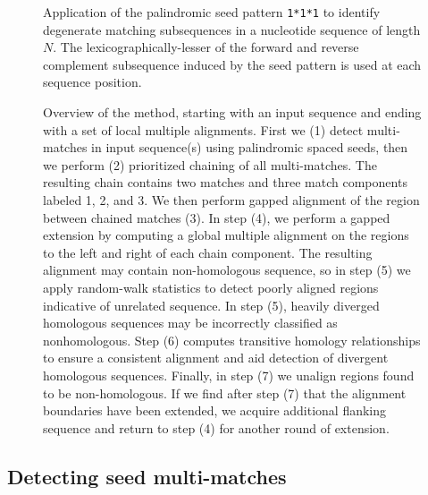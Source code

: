 \documentclass[twoside,11pt]{article}
\begin{document}
\begin{figure}[t]
\centering {}
\caption{Application of the palindromic seed pattern
\texttt{1*1*1} to identify degenerate matching subsequences in a
nucleotide sequence of length $N$. The lexicographically-lesser of
the forward and reverse complement subsequence induced by the seed
pattern is used at each sequence position.}

\label{fig-seeds}\vspace{-0.2cm}
\end{figure}

\begin{figure}
\begin{center}
\end{center}
\caption{Overview of the method, starting with an input sequence and ending with a set of local multiple alignments. First we (1) detect multi-matches in input sequence(s) using palindromic spaced seeds, then we perform (2) prioritized chaining of all multi-matches.  The resulting chain contains two matches and three match components labeled 1, 2, and 3.  We then perform gapped alignment of the region between chained matches (3).   In step (4), we perform a gapped extension by computing a global multiple alignment on the regions to the left and right of each chain component.  The resulting alignment may contain non-homologous sequence, so in step (5) we apply random-walk statistics to detect poorly aligned regions indicative of unrelated sequence.  In step (5), heavily diverged homologous sequences may be incorrectly classified as nonhomologous.  Step (6) computes transitive homology relationships to ensure a consistent alignment and aid detection of divergent homologous sequences.  Finally, in step (7) we unalign regions found to be non-homologous.  If we find after step (7) that the alignment boundaries have been extended, we acquire additional flanking sequence and return to step (4) for another round of extension.}
\label{fig-main}
\end{figure}



\subsection{Detecting seed multi-matches}
\end{document}
